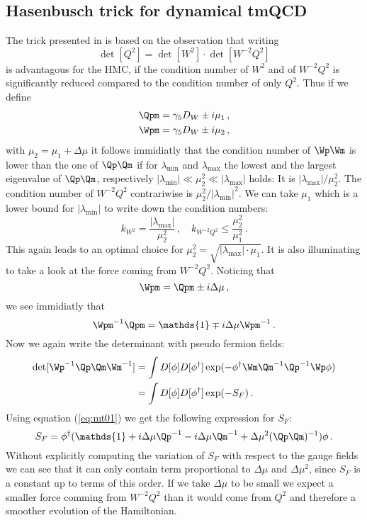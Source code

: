 \subsection{Hasenbusch trick for dynamical tmQCD}

The trick presented in \cite{Hasenbusch:2002ai} is based on the
observation that writing
\[
\det[Q^2] = \det[W^2]\cdot\det[W^{-2}Q^2]
\]
is advantagous for the HMC, if the condition number of $W^{2}$ and of
$W^{-2}Q^{2}$ is significantly reduced compared to the condition number
of only $Q^2$. Thus if we define
\[
\begin{split}
  \Qpm = \gamma_5 D_W \pm i\mu_1\, ,\\
  \Wpm = \gamma_5 D_W \pm i\mu_2\, ,\\
\end{split}
\]
with $\mu_2 =\mu_1+\Delta\mu$ it follows immidiatly that the condition number of
$\Wp\Wm$ is lower than the one of $\Qp\Qm$ if for $\lambda_{\textrm{min}}$
and $\lambda_{\textrm{max}}$ the lowest and the largest eigenvalue of
$\Qp\Qm$, respectively $|\lambda_{\textrm{min}}|\ll\mu_2^2\ll|\lambda_{\textrm{max}}|$
holds: It is $|\lambda_{\textrm{max}}|/\mu_2^2$. The condition number of
$W^{-2}Q^{2}$ contrariwise is $\mu_2^2/|\lambda_{\textrm{min}}|^2$. We can take
$\mu_1$ which is a lower bound for $|\lambda_{\textrm{min}}|$ to write down
the condition numbers:
\[
k_{W^2} = \frac{|\lambda_{\textrm{max}}|}{\mu_2^2}\, ,\quad
k_{W^{-2}Q^{2}} \leq \frac{\mu_2^2}{\mu_1^2}\, .
\]
This again leads to an optimal choice for
$\mu_2^2=\sqrt{|\lambda_{\textrm{max}}|\cdot\mu_1}$. It is also illuminating to take
a look at the force coming from $W^{-2}Q^{2}$. Noticing that
\[
\Wpm = \Qpm \pm i\Delta\mu\, ,
\]
we see immidiatly that
\begin{equation}
  \label{eq:mt01}
  \Wpm^{-1}\Qpm = \mathds{1} \mp i\Delta\mu\Wpm^{-1}\, .
\end{equation}
Now we again write the determinant with pseudo fermion
fields:
\[
\begin{split}
  \det[\Wp^{-1}\Qp\Qm\Wm^{-1}] &= \int D[\phi]D[\phi^\dagger]
  \exp(-\phi^\dagger\Wm\Qm^{-1}\Qp^{-1}\Wp\phi) \\
  &=  \int D[\phi]D[\phi^\dagger] \exp(-S_F)\, .
\end{split}
\]
Using equation (\ref{eq:mt01}) we get the following expression for
$S_F$:
\begin{equation}
  \label{eq:mt02}
  S_F = \phi^\dagger(\mathds{1} +i\Delta\mu\Qp^{-1}
  -i\Delta\mu\Qm^{-1}+\Delta\mu^2(\Qp\Qm)^{-1}) \phi\, .
\end{equation}
Without explicitly computing the variation of $S_F$ with respect to
the gauge fields we can see that it can only contain term proportional
to $\Delta\mu$ and $\Delta\mu^2$, since $S_F$ is a constant up to terms of this
order. If we take $\Delta\mu$ to be small we expect a smaller force comming
from $W^{-2}Q^{2}$ than it would come from $Q^2$ and therefore a
smoother evolution of the Hamiltonian.

